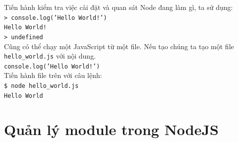 \documentclass[a4paper,12pt]{report}
\begin{document}
Tiến hành kiểm tra việc cài đặt và quan sát Node đang làm gì, ta sử dụng: \\
	\texttt{> console.log('Hello World!')}\\
	\texttt{Hello World!} \\
	\texttt{> undefined} \\

Cũng có thể chạy một JavaScript từ một file. Nếu tạo chúng ta tạo một file \texttt{hello\_world.js} với nội dung.\\
	\texttt{console.log('Hello World!')}\\

Tiến hành file trên với câu lệnh:\\
	\texttt{\$ node hello\_world.js} \\
	\texttt{Hello World}
\section{Quản lý module trong NodeJS}
\end{document}
